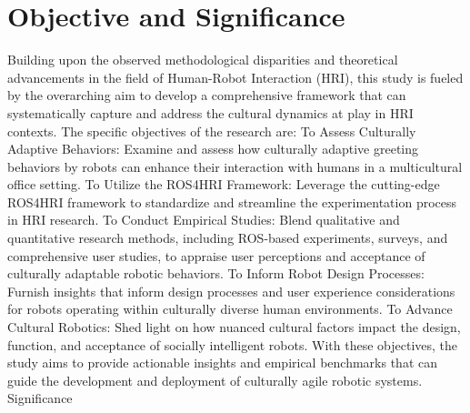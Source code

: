 
\chapter{Objective and Significance}


Building upon the observed methodological disparities and theoretical advancements in the field of Human-Robot Interaction (HRI), this study is fueled by the overarching aim to develop a comprehensive framework that can systematically capture and address the cultural dynamics at play in HRI contexts. The specific objectives of the research are:
To Assess Culturally Adaptive Behaviors: Examine and assess how culturally adaptive greeting behaviors by robots can enhance their interaction with humans in a multicultural office setting.
To Utilize the ROS4HRI Framework: Leverage the cutting-edge ROS4HRI framework to standardize and streamline the experimentation process in HRI research.
To Conduct Empirical Studies: Blend qualitative and quantitative research methods, including ROS-based experiments, surveys, and comprehensive user studies, to appraise user perceptions and acceptance of culturally adaptable robotic behaviors.
To Inform Robot Design Processes: Furnish insights that inform design processes and user experience considerations for robots operating within culturally diverse human environments.
To Advance Cultural Robotics: Shed light on how nuanced cultural factors impact the design, function, and acceptance of socially intelligent robots.
With these objectives, the study aims to provide actionable insights and empirical benchmarks that can guide the development and deployment of culturally agile robotic systems.
Significance


